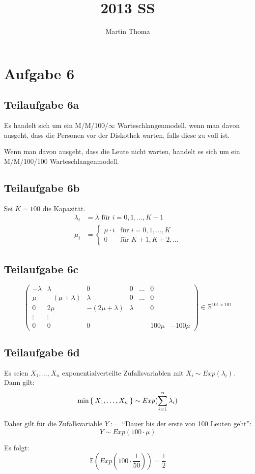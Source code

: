 \documentclass[a4paper]{scrartcl}
\begin{document}
 \title{2013 SS}
 \author{Martin Thoma}

 \setcounter{section}{1}
 \section*{Aufgabe 6}
 \subsection*{Teilaufgabe 6a}
Es handelt sich um ein M/M/100/$\infty$ Warteschlangenmodell, wenn man davon
ausgeht, dass die Personen vor der Diskothek warten, falls diese zu voll ist.

Wenn man davon ausgeht, dass die Leute nicht warten, handelt es sich um ein
M/M/100/100 Warteschlangenmodell.

\subsection*{Teilaufgabe 6b}
Sei $K=100$ die Kapazität.
\begin{align}
    \lambda_i &= \lambda \text{ für } i=0, 1, \dots, K-1\\
    \mu_i     &= \begin{cases}\mu \cdot i &\text{für } i=0, 1, \dots, K\\
                              0           &\text{für } K+1, K+2, \dots \end{cases}
\end{align}

\subsection*{Teilaufgabe 6c}
\[\begin{pmatrix}
- \lambda & \lambda &0 & 0 & \dots & 0\\
\mu & -(\mu+\lambda) & \lambda &0 & \dots & 0\\
0 & 2 \mu & -(2\mu+\lambda) & \lambda & & 0\\
\vdots & \vdots & & & &\\
0 & 0 &0 & & & 100 \mu & -100\mu
\end{pmatrix} \in \mathbb{R}^{101 \times 101}\]


\subsection*{Teilaufgabe 6d}
Es seien $X_1, \dots, X_n$ exponentialverteilte Zufallsvariablen mit $X_i \sim Exp(\lambda_i)$.
Dann gilt:
\[\min\Set{X_1, \dots, X_n} \sim Exp(\sum_{i=1}^n \lambda_i)\]

Daher gilt für die Zufallsvariable $Y := $ \enquote{Dauer bis der erste von 100 Leuten geht}:
\[Y \sim Exp(100 \cdot \mu)\]

Es folgt:
\[\mathbb{E}(Exp(100 \cdot \frac{1}{50})) = \frac{1}{2}\]
\end{document}
